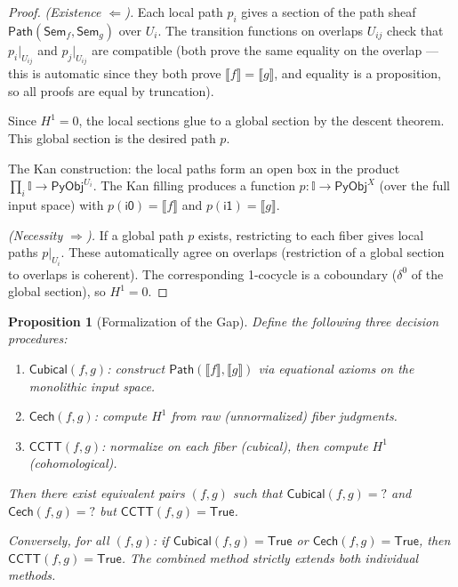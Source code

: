 \documentclass[11pt,a4paper]{report}
\theoremstyle{definition}
\theoremstyle{plain}
\newtheorem{proposition}[definition]{Proposition}
\newcommand{\den}[1]{\llbracket #1 \rrbracket}
\newcommand{\Path}{\mathsf{Path}}
\newcommand{\PyObj}{\mathsf{PyObj}}
\newcommand{\Sem}{\mathsf{Sem}}
\newcommand{\Hone}{H^1}
\newcommand{\interval}{\mathbb{I}}
\begin{document}
\begin{proof}
\emph{(Existence $\Leftarrow$).}
Each local path $p_i$ gives a section of the path sheaf
$\Path(\Sem_f, \Sem_g)$ over $U_i$.  The transition functions on
overlaps $U_{ij}$ check that $p_i|_{U_{ij}}$ and $p_j|_{U_{ij}}$
are compatible (both prove the same equality on the overlap --- this
is automatic since they both prove $\den{f} = \den{g}$, and equality
is a proposition, so all proofs are equal by truncation).

Since $\Hone = 0$, the local sections glue to a global section by
the descent theorem.  This global section is the desired path $p$.

The Kan construction: the local paths form an open box in the product
$\prod_i \interval \to \PyObj^{U_i}$.  The Kan filling produces a
function $p : \interval \to \PyObj^X$ (over the full input space)
with $p(\mathsf{i0}) = \den{f}$ and $p(\mathsf{i1}) = \den{g}$.

\emph{(Necessity $\Rightarrow$).}
If a global path $p$ exists, restricting to each fiber gives local
paths $p|_{U_i}$.  These automatically agree on overlaps (restriction
of a global section to overlaps is coherent).  The corresponding
1-cocycle is a coboundary ($\delta^0$ of the global section), so
$\Hone = 0$.
\end{proof}

\begin{proposition}[Formalization of the Gap]
\label{prop:gap}
Define the following three decision procedures:
\begin{enumerate}
  \item $\mathsf{Cubical}(f, g)$: construct $\Path(\den{f}, \den{g})$
    via equational axioms on the monolithic input space.
  \item $\mathsf{Cech}(f, g)$: compute $\Hone$ from raw (unnormalized)
    fiber judgments.
  \item $\mathsf{CCTT}(f, g)$: normalize on each fiber (cubical), then
    compute $\Hone$ (cohomological).
\end{enumerate}
Then there exist equivalent pairs $(f, g)$ such that
$\mathsf{Cubical}(f, g) = {?}$ and $\mathsf{Cech}(f, g) = {?}$
but $\mathsf{CCTT}(f, g) = \mathsf{True}$.

Conversely, for all $(f, g)$: if $\mathsf{Cubical}(f, g) =
\mathsf{True}$ or $\mathsf{Cech}(f, g) = \mathsf{True}$, then
$\mathsf{CCTT}(f, g) = \mathsf{True}$.  The combined method
\emph{strictly extends} both individual methods.
\end{proposition}
\end{document}
